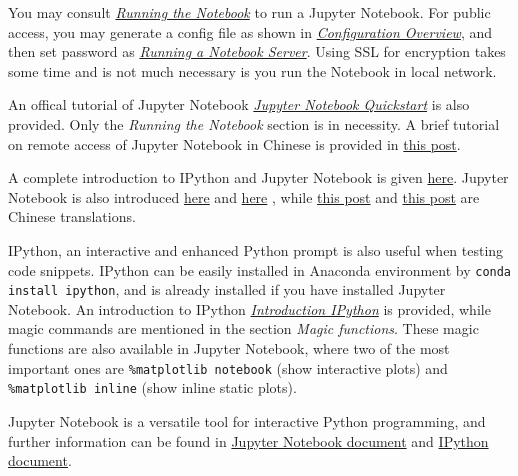 \documentclass[english]{../TeXTemplate/pkupaper}
\begin{document}
You may consult \href{https://jupyter.readthedocs.io/en/latest/running.html}{\emph{Running the Notebook}} to run a Jupyter Notebook. For public access, you may generate a config file as shown in \href{https://jupyter-notebook.readthedocs.io/en/stable/config_overview.html}{\emph{Configuration Overview}}, and then set password as \href{https://jupyter-notebook.readthedocs.io/en/stable/public_server.html}{\emph{Running a Notebook Server}}. Using SSL for encryption takes some time and is not much necessary is you run the Notebook in local network.

An offical tutorial of Jupyter Notebook \href{https://jupyter.readthedocs.io/en/latest/content-quickstart.html}{\emph{Jupyter Notebook Quickstart}} is also provided. Only the \emph{Running the Notebook} section is in necessity. A brief tutorial on remote access of Jupyter Notebook in Chinese is provided in \href{http://blog.csdn.net/bitboy_star/article/details/51427306}{this post}.

A complete introduction to IPython and Jupyter Notebook is given \href{http://blog.csdn.net/mzpmzk/article/details/72310105}{here}. Jupyter Notebook is also introduced \href{https://www.packtpub.com/books/content/getting-started-jupyter-notebook-part-1}{here} and \href{https://www.packtpub.com/books/content/getting-started-jupyter-notebook-part-2}{here} , while \href{http://blog.csdn.net/red_stone1/article/details/72858962}{this post} and \href{http://blog.csdn.net/red_stone1/article/details/72863749}{this post} are Chinese translations.

IPython, an interactive and enhanced Python prompt is also useful when testing code snippets. IPython can be easily installed in Anaconda environment by \verb"conda install ipython", and is already installed if you have installed Jupyter Notebook. An introduction to IPython \href{https://ipython.readthedocs.io/en/stable/interactive/tutorial.html}{\emph{Introduction IPython}} is provided, while magic commands are mentioned in the section \emph{Magic functions}. These magic functions are also available in Jupyter Notebook, where two of the most important ones are \verb"%matplotlib notebook" (show interactive plots) and \verb"%matplotlib inline" (show inline static plots).

Jupyter Notebook is a versatile tool for interactive Python programming, and further information can be found in \href{https://jupyter-notebook.readthedocs.io/en/stable/index.html}{Jupyter Notebook document} and \href{https://ipython.readthedocs.io/en/stable/index.html}{IPython document}.
\end{document}
